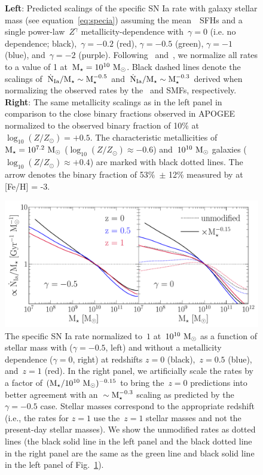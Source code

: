 \documentclass[foo.tex]{subfiles}
\begin{document}
\begin{figure}
\caption{
\textbf{Left}: Predicted scalings of the specific SN Ia rate with galaxy
stellar mass (see equation~\ref{eq:specia}) assuming the mean~\um~SFHs and a
single power-law~$Z^\gamma$ metallicity-dependence with~$\gamma = 0$ (i.e. no
dependence; black),~$\gamma = -0.2$ (red), $\gamma = -0.5$ (green),
$\gamma = -1$ (blue), and~$\gamma = -2$ (purple).
Following~\citet{Brown2019} and~\citet{Gandhi2022}, we normalize all rates to
a value of 1 at~$\text{M}_\star = 10^{10}~\text{M}_\odot$.
Black dashed lines denote the scalings of~$\dot{\text{N}}_\text{Ia} / \text{M}_\star
\sim \text{M}_\star^{-0.5}$ and~$\dot{\text{N}}_\text{Ia} / \text{M}_\star \sim \text{M}_\star^{-0.3}$
derived when normalizing the observed rates by the~\citet{Bell2003} and
\citet{Baldry2012} SMFs, respectively.
\textbf{Right}: The same metallicity scalings as in the left panel in
comparison to the close binary fractions observed in APOGEE
\citep[][black dashed line with error bars]{Moe2019} normalized to the observed
binary fraction of 10\% at~$\log_{10}(Z / Z_\odot) = +0.5$.
The characteristic metallicities of~$\text{M}_\star = 10^{7.2}~\text{M}_\odot$
($\log_{10}(Z / Z_\odot) \approx -0.6$) and~$10^{10}~\text{M}_\odot$ galaxies 
($\log_{10}(Z / Z_\odot) \approx +0.4$) are marked with black dotted lines.
The arrow denotes the binary fraction of 53\%~$\pm$ 12\% measured by
\citet{Moe2019} at [Fe/H] = -3.
}
\label{fig:specia_metdep}
\end{figure}

\begin{figure}
\centering
\includegraphics[scale = 0.65]{umachine_iarate_redshiftevol.pdf}
\caption{
The specific SN Ia rate normalized to~$1$ at~$10^{10}~\text{M}_\odot$ as a function of
stellar mass with ($\gamma = -0.5$, left) and without a metallicity dependence
($\gamma = 0$, right) at redshifts $z = 0$ (black),~$z = 0.5$ (blue),
and~$z = 1$ (red).
In the right panel, we artificially scale the rates by a factor of
$(\text{M}_\star / 10^{10}~\text{M}_\odot)^{-0.15}$ to bring the~$z = 0$ predictions into
better agreement with an~$\sim \text{M}_\star^{-0.3}$ scaling as predicted by the
$\gamma = -0.5$ case.
Stellar masses correspond to the appropriate redshift (i.e., the rates for
$z = 1$ use the~$z = 1$ stellar masses and not the present-day stellar
masses).
We show the unmodified rates as dotted lines (the black solid line in the left
panel and the black dotted line in the right panel are the same as the green
line and black solid line in the left panel of Fig.~\ref{fig:specia_metdep}).
}
\label{fig:specia_zdep}
\end{figure}
\end{document}
